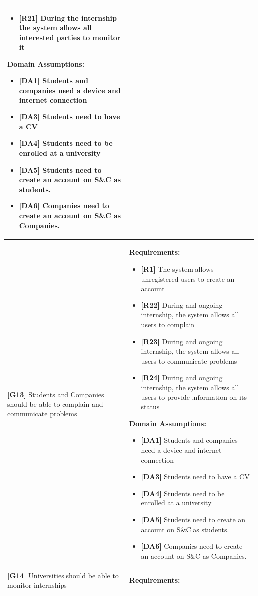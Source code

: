 \begin{longtable}{|p{}|p{}|}
\begin{itemize}
    \item \textbf{[R21]} During the internship the system allows all interested parties to monitor it
\end{itemize}
\textbf{Domain Assumptions:}
\begin{itemize}
     \item \textbf{[DA1]} Students and companies need a device and internet connection
     \item \textbf{[DA3]} Students need to have a CV
     \item \textbf{[DA4]} Students need to be enrolled at a university
    \item \textbf{[DA5]} Students need to create an account on S\&C as students.
    \item \textbf{[DA6]} Companies need to create an account on S\&C as Companies.
\end{itemize} \\
\hline
\textbf{[G13]} Students and Companies should be able to complain and communicate problems
& 
\textbf{Requirements:}
\begin{itemize}
    \item \textbf{[R1]} The system allows unregistered users to create an account
    \item \textbf{[R22]} During and ongoing internship, the system allows all users to complain
    \item \textbf{[R23]} During and ongoing internship, the system allows all users to communicate problems
    \item \textbf{[R24]} During and ongoing internship, the system allows all users to provide information on its status
\end{itemize}
\textbf{Domain Assumptions:}
\begin{itemize}
    \item \textbf{[DA1]} Students and companies need a device and internet connection
     \item \textbf{[DA3]} Students need to have a CV
     \item \textbf{[DA4]} Students need to be enrolled at a university
    \item \textbf{[DA5]} Students need to create an account on S\&C as students.
    \item \textbf{[DA6]} Companies need to create an account on S\&C as Companies.
\end{itemize} \\
\hline
\textbf{[G14]} Universities should be able to monitor internships
& 
\textbf{Requirements:}

\end{longtable}

